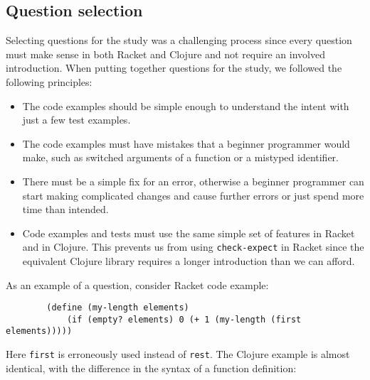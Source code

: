 \documentclass[submission,copyright,creativecommons]{eptcs}
\begin{document}
\subsection{Question selection}\label{sec:select}
	Selecting questions for the study was a challenging process since every question must make sense in both Racket and Clojure and not require an involved introduction. %
	When putting together questions for the study, we followed the following principles:
	\begin{itemize}
	\item The code examples should be simple enough to understand the  intent with just a few test examples. 
	\item The code examples must have mistakes that a beginner programmer would make, such as switched arguments of a function or a mistyped identifier. 
	\item There must be a simple fix for an error, otherwise  a beginner
	programmer can start making complicated changes and cause further errors or just spend more time than intended.  %
	\item Code examples and tests must use the same simple set of features in Racket and in Clojure. This prevents us from using \texttt{check-expect} in Racket since the equivalent Clojure library requires a longer introduction than we can afford. 
	\end{itemize}
As an example of a question, consider Racket code example: 
\begin{verbatim}
		(define (my-length elements)
  			(if (empty? elements) 0 (+ 1 (my-length (first elements)))))
\end{verbatim}
Here {\tt first} is erroneously used instead of {\tt rest}. The Clojure example is almost identical, with the difference in the syntax of a function definition: 
\end{document}
